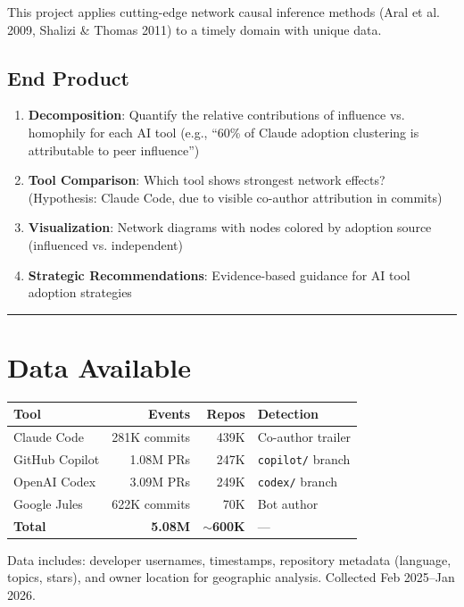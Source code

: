 \documentclass[11pt,letterpaper]{article}
\begin{document}
This project applies cutting-edge network causal inference methods (Aral et al. 2009, Shalizi \& Thomas 2011) to a timely domain with unique data.

\subsection*{End Product}

\begin{enumerate}
    \item \textbf{Decomposition}: Quantify the relative contributions of influence vs. homophily for each AI tool (e.g., ``60\% of Claude adoption clustering is attributable to peer influence'')
    \item \textbf{Tool Comparison}: Which tool shows strongest network effects? (Hypothesis: Claude Code, due to visible co-author attribution in commits)
    \item \textbf{Visualization}: Network diagrams with nodes colored by adoption source (influenced vs. independent)
    \item \textbf{Strategic Recommendations}: Evidence-based guidance for AI tool adoption strategies
\end{enumerate}

\vspace{1em}
\hrule
\vspace{0.5em}

\section*{Data Available}

\begin{table}[h]
\centering
\small
\begin{tabular}{lrrl}
\toprule
\textbf{Tool} & \textbf{Events} & \textbf{Repos} & \textbf{Detection} \\
\midrule
Claude Code & 281K commits & 439K & Co-author trailer \\
GitHub Copilot & 1.08M PRs & 247K & \texttt{copilot/} branch \\
OpenAI Codex & 3.09M PRs & 249K & \texttt{codex/} branch \\
Google Jules & 622K commits & 70K & Bot author \\
\midrule
\textbf{Total} & \textbf{5.08M} & \textbf{$\sim$600K} & --- \\
\bottomrule
\end{tabular}
\end{table}

Data includes: developer usernames, timestamps, repository metadata (language, topics, stars), and owner location for geographic analysis. Collected Feb 2025--Jan 2026.
\end{document}
